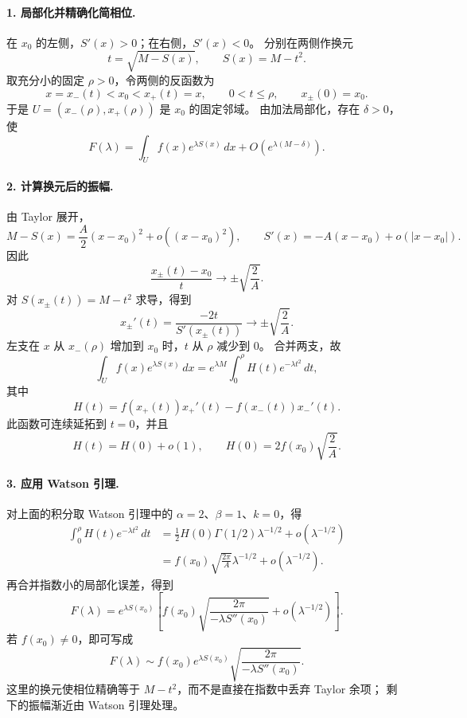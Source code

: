 \documentclass[11pt,a4paper]{ctexart}
\begin{document}
\paragraph{1. 局部化并精确化简相位.}
在 $x_0$ 的左侧，$S'(x)>0$；在右侧，$S'(x)<0$。
分别在两侧作换元
\[
 t=\sqrt{M-S(x)},\qquad S(x)=M-t^2.
\]
取充分小的固定 $\rho>0$，令两侧的反函数为
\[
 x=x_-(t)<x_0<x_+(t)=x,\qquad 0<t\le\rho,
 \qquad x_\pm(0)=x_0.
\]
于是 $U=(x_-(\rho),x_+(\rho))$ 是 $x_0$ 的固定邻域。
由加法局部化，存在 $\delta>0$，使
\[
 F(\lambda)=\int_U f(x)e^{\lambda S(x)}\,dx
 +O(e^{\lambda(M-\delta)}).
\]

\paragraph{2. 计算换元后的振幅.}
由 Taylor 展开，
\[
 M-S(x)=\frac A2(x-x_0)^2+o((x-x_0)^2),\qquad
 S'(x)=-A(x-x_0)+o(|x-x_0|).
\]
因此
\[
 \frac{x_\pm(t)-x_0}{t}\longrightarrow\pm\sqrt{\frac2A}.
\]
对 $S(x_\pm(t))=M-t^2$ 求导，得到
\[
 x_\pm'(t)=\frac{-2t}{S'(x_\pm(t))}
 \longrightarrow\pm\sqrt{\frac2A}.
\]
左支在 $x$ 从 $x_-(\rho)$ 增加到 $x_0$ 时，$t$ 从 $\rho$ 减少到 $0$。
合并两支，故
\[
 \int_U f(x)e^{\lambda S(x)}\,dx
 =e^{\lambda M}\int_0^\rho H(t)e^{-\lambda t^2}\,dt,
\]
其中
\[
 H(t)=f(x_+(t))x_+'(t)-f(x_-(t))x_-'(t).
\]
此函数可连续延拓到 $t=0$，并且
\[
 H(t)=H(0)+o(1),\qquad
 H(0)=2f(x_0)\sqrt{\frac2A}.
\]

\paragraph{3. 应用 Watson 引理.}
对上面的积分取 Watson 引理中的 $\alpha=2$、$\beta=1$、$k=0$，得
\begin{align*}
 \int_0^\rho H(t)e^{-\lambda t^2}\,dt
 &=\frac12H(0)\Gamma(1/2)\lambda^{-1/2}
   +o(\lambda^{-1/2})\\
 &=f(x_0)\sqrt{\frac{2\pi}{A}}\lambda^{-1/2}
   +o(\lambda^{-1/2}).
\end{align*}
再合并指数小的局部化误差，得到
\[
 \boxed{
 F(\lambda)=e^{\lambda S(x_0)}
 \left[f(x_0)\sqrt{\frac{2\pi}{-\lambda S''(x_0)}}
 +o(\lambda^{-1/2})\right].
 }
\]
若 $f(x_0)\ne0$，即可写成
\[
 F(\lambda)\sim f(x_0)e^{\lambda S(x_0)}
 \sqrt{\frac{2\pi}{-\lambda S''(x_0)}}.
\]
这里的换元使相位精确等于 $M-t^2$，而不是直接在指数中丢弃 Taylor 余项；
剩下的振幅渐近由 Watson 引理处理。
\end{document}
